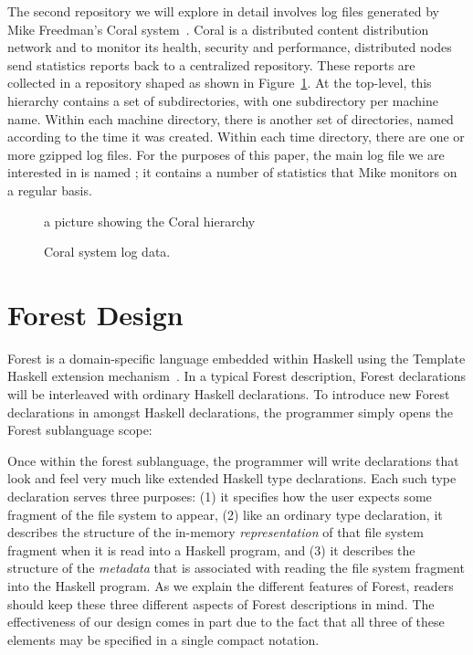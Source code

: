 \documentclass[natbib]{sigplanconf}
\begin{document}
The second repository we will explore in detail involves
log files generated by Mike Freedman's Coral system~\cite{freedman+:coral,freedman:coral-experience}.  Coral is a distributed content distribution network and
to monitor its health, security and performance, distributed nodes send
statistics reports back to a centralized repository.  These reports
are collected in a repository shaped as shown in Figure~\ref{fig:coral-pic}.
At the top-level, this hierarchy contains a set of subdirectories, with
one subdirectory per machine name.  Within each machine directory, there is 
another set of directories, named according to the time it was created.
Within each time directory, there are one or more gzipped log files.
For the purposes of this paper, the main log file we are interested 
in is named ; it contains a number of statistics
that Mike monitors on a regular basis. 

\begin{figure}

a picture showing the Coral hierarchy

\caption{Coral system log data.}
\label{fig:coral-pic}
\end{figure}

\section{Forest Design}
\label{sec:review}

Forest is a domain-specific language embedded within Haskell using the
Template Haskell extension mechanism~\cite{metahaskell}.  In a typical
Forest description, Forest declarations will be interleaved with ordinary
Haskell declarations.  To introduce new Forest declarations in amongst
Haskell declarations,
the programmer simply opens the Forest sublanguage scope:
\begin{code}
\end{code}

Once within the forest sublanguage, the programmer will write declarations
that look and feel very much like extended Haskell type declarations.
Each such type declaration serves three purposes: (1) it specifies how the user
expects some fragment of the file system to appear, (2) like an ordinary type
declaration, it describes the structure of the in-memory {\em representation} of that 
file system fragment when it is read into a Haskell program, and (3) it describes 
the structure of the {\em metadata} that is associated with reading the file system
fragment into the Haskell program.  As we explain the different features of Forest, 
readers should keep these three different aspects of Forest descriptions in mind.  
The effectiveness of our design comes in part due to the fact that all three of these 
elements may be specified in a single compact notation.
\end{document}
